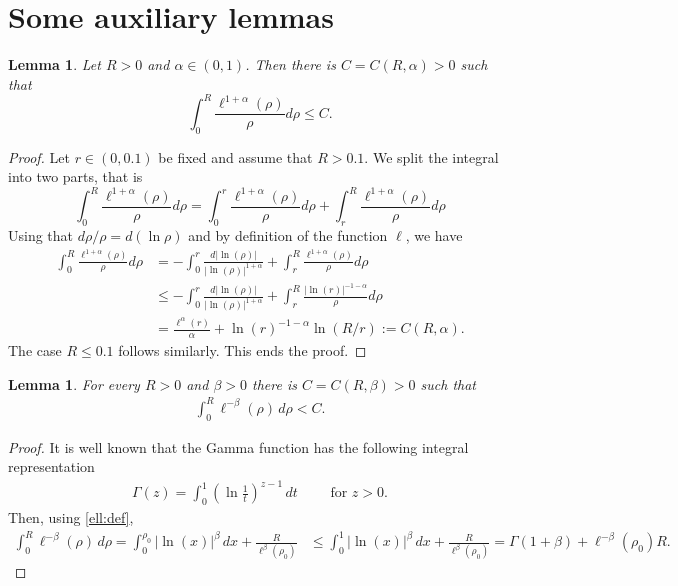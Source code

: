 \documentclass[10 pt]{article}
\newtheorem{lemma}[theorem]{Lemma}
\numberwithin{equation}{section}
\begin{document}
\section{Some auxiliary lemmas}
%
\begin{lemma}\label{lem:over}
Let $R>0$ and $\alpha\in(0,1)$. Then there is $C=C(R,\alpha)>0$ such that 
%
\begin{equation*}
    \int_0^{R} \frac{\ell^{1+\alpha}(\rho)}{\rho}d\rho\leq C.
\end{equation*}
%
\end{lemma}
%
\begin{proof}
Let $r\in(0,0.1)$ be fixed and assume that $R>0.1$. We split the integral into two parts, that is
%
\begin{equation*}
    \int_{0}^{R}\frac{\ell^{1+\alpha}(\rho)}{\rho}d\rho=\int_{0}^{r} \frac{\ell^{1+\alpha}(\rho)}{\rho}d\rho + \int_{r}^{R}\frac{\ell^{1+\alpha}(\rho)}{\rho}d\rho
\end{equation*}
%
Using that $d\rho/\rho=d(\ln \rho)$ and by definition of the function $\ell$, we have
%
\begin{align*}
    \int_{0}^{R}\frac{\ell^{1+\alpha}(\rho)}{\rho}d\rho &=-\int_{0}^{r} \frac{d|\ln(\rho)|}{|\ln(\rho)|^{1+\alpha}} + \int_{r}^{R}\frac{\ell^{1+\alpha}(\rho)}{\rho}d\rho 
    \\ &\leq -\int_{0}^{r} \frac{d|\ln(\rho)|}{|\ln(\rho)|^{1+\alpha}} + \int_{r}^{R}\frac{|\ln(r)|^{-1-\alpha}}{\rho}d\rho \\
    &=\frac{\ell^\alpha(r)}{\alpha}+\ln(r)^{-1-\alpha}\ln(R/r):=C(R,\alpha).
\end{align*}
%
The case $R\leq 0.1$ follows similarly. This ends the proof. 
\end{proof}

\begin{lemma}\label{lem:ellbeta}
For every $R>0$ and $\beta>0$ there is $C=C(R,\beta)>0$ such that
\begin{align*}
\int_0^R \ell^{-\beta}(\rho)\, d\rho<C.
\end{align*}
\end{lemma}
\begin{proof}
 It is well known that the Gamma function has the following integral representation
 \begin{align*}
     \Gamma(z)=\int_0^1\left(\ln \frac{1}{t}\right)^{z-1}\, dt\qquad \text{ for }z>0.
 \end{align*}
Then, using \eqref{ell:def},
\begin{align*}
\int_0^R \ell^{-\beta}(\rho)\,d\rho
=
\int_0^{\rho_0} |\ln(x)|^{\beta}\,dx
+
\frac{R}{\ell^{\beta}(\rho_0)}
&\leq 
\int_0^{1} |\ln(x)|^{\beta}\,dx
+
\frac{R}{\ell^{\beta}(\rho_0)}=\Gamma(1+\beta)+\ell^{-\beta}(\rho_0)R.
\end{align*}
\end{proof}
\end{document}
